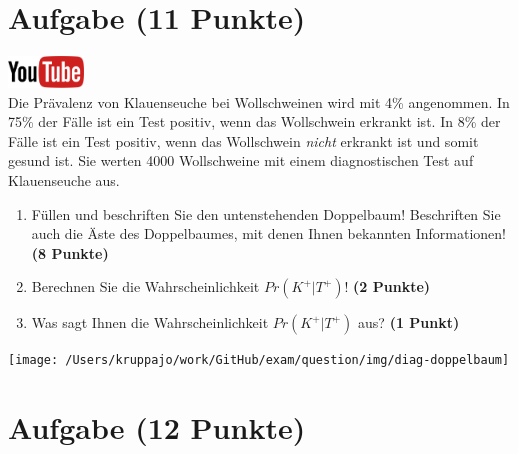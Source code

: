 \documentclass[a4paper, 9pt]{scrartcl}\usepackage[]{graphicx}\usepackage[]{xcolor}
\begin{document}
\clearpage

\section{Aufgabe \hfill (11 Punkte)}

\hfill\href{https://youtu.be/VQlNl8hvRII}{\includegraphics[width =
  2cm]{img/youtube}}\\[1Ex]


Die Pr{\"a}valenz von Klauenseuche bei Wollschweinen wird mit
4\% angenommen. In 75\% der F{\"a}lle ist ein Test positiv, wenn das Wollschwein erkrankt
ist. In 8\% der F{\"a}lle ist ein Test positiv,
wenn das Wollschwein \textit{nicht} erkrankt ist und somit gesund ist. Sie
werten 4000 Wollschweine mit einem
diagnostischen Test auf Klauenseuche aus.



\begin{enumerate}
\item F{\"u}llen und beschriften Sie den untenstehenden Doppelbaum! Beschriften
  Sie auch die {\"A}ste des Doppelbaumes, mit denen Ihnen bekannten
  Informationen!  \textbf{(8 Punkte)}
\item Berechnen Sie die Wahrscheinlichkeit $Pr(K^+|T^+)$! \textbf{(2 Punkte)}
\item Was sagt Ihnen die Wahrscheinlichkeit $Pr(K^+|T^+)$ aus? \textbf{(1 Punkt)}
\end{enumerate}

\vspace{1cm}

\begin{center}
  \texttt{[image: /Users/kruppajo/work/GitHub/exam/question/img/diag-doppelbaum]}
\end{center}



 
\clearpage

\section{Aufgabe \hfill (12 Punkte)}
\end{document}
